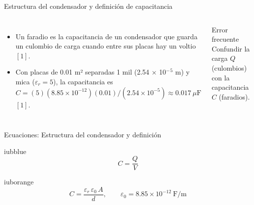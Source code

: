 \documentclass[aspectratio=169,11pt,xcolor={table}]{beamer}
\begin{document}
\begin{frame}{{\normalsize Estructura del condensador y definición de capacitancia}}
\begin{columns}[c,onlytextwidth]
\small
\begin{itemize}\setlength{\itemsep}{4pt}
  \item Un faradio es la capacitancia de un condensador que guarda un culombio de carga cuando entre sus placas hay un voltio $[1]$.
  \item Con placas de 0.01 m² separadas 1 mil (2.54 × 10\ensuremath{^{-}}\ensuremath{^{5}} m) y mica ($\varepsilon_r = 5$), la capacitancia es $C = (5)(8.85 \times 10^{-12})(0.01) / (2.54 \times 10^{-5}) \approx 0.017\ \mu\text{F}$ $[1]$.
\end{itemize}
\begin{cardO}{Error frecuente}
\footnotesize Confundir la carga $Q$ (culombios) con la capacitancia $C$ (faradios).
\end{cardO}
\end{columns}
\end{frame}

\begin{frame}{{\normalsize Ecuaciones: Estructura del condensador y definición}}
\begin{cajaplana}{iubblue}
\centering
{\large
\begin{equation*}
  C = \frac{Q}{V}
\end{equation*}
}
\end{cajaplana}
\vspace{1mm}
\begin{cajaplana}{iuborange}
\centering
{\large
\begin{equation*}
  C = \frac{\varepsilon_r \, \varepsilon_0 \, A}{d}, \qquad \varepsilon_0 = 8.85 \times 10^{-12}\ \text{F/m}
\end{equation*}
}
\end{cajaplana}
\end{frame}
\end{document}
